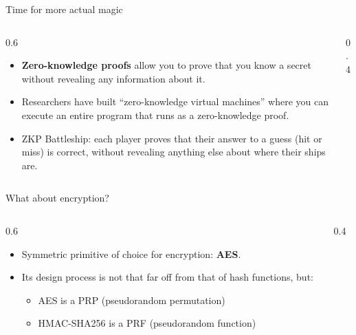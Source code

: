 \ifdefined\PRESENTATION\else\PassOptionsToClass{handout}{beamer}\fi\documentclass[aspectratio=169, lualatex]{beamer}
\begin{document}
\begin{frame}{Time for more actual magic}
	\begin{columns}[c]
		\begin{column}{0.6\textwidth}
			\begin{itemize}[<+->]
				\item \textbf{Zero-knowledge proofs} allow you to prove that you know
				      a secret without revealing any information about it.
				\item Researchers have built ``zero-knowledge virtual machines'' where you can execute
				      an entire program that runs as a zero-knowledge proof.
				\item ZKP Battleship: each player proves that their answer to a guess
				      (hit or miss) is correct, without revealing anything else about
				      where their ships are.
			\end{itemize}
		\end{column}
		\begin{column}{0.4\textwidth}
		\end{column}
	\end{columns}
\end{frame}

\begin{frame}{What about encryption?}
	\begin{columns}[c]
		\begin{column}{0.6\textwidth}
			\begin{itemize}[<+->]
				\item Symmetric primitive of choice for encryption: \textbf{AES}.
				\item Its design process is not that far off from that of hash functions,
				      but:
				      \begin{itemize}[<+->]
					      \item AES is a PRP (pseudorandom permutation)
					      \item HMAC-SHA256 is a PRF (pseudorandom function)
				      \end{itemize}
			\end{itemize}
		\end{column}

		\begin{column}{0.4\textwidth}
		\end{column}
	\end{columns}
\end{frame}
\end{document}
